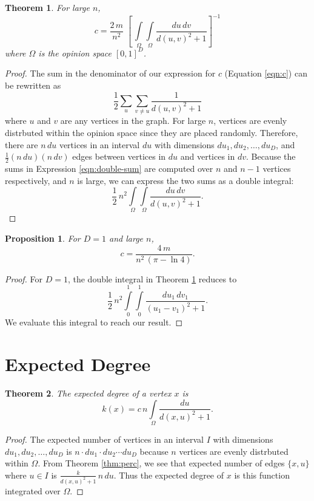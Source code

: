 \documentclass[a4paper,10pt]{article}
\newtheorem{prop}{Proposition}
\newtheorem{theorem}{Theorem}
\begin{document}
\begin{theorem}
\label{thm:c}
For large $n$,
 \begin{equation}
  c = \frac{2\, m}{n^2} \; \left[\,\int\limits_\Omega \int\limits_\Omega \frac{du\, dv}{d(u, v)^2 + 1}\right]^{-1}
 \end{equation}
where $\Omega$ is the opinion space $[0, 1]^D$.
\end{theorem}
\begin{proof}
 The sum in the denominator of our expression for $c$ (Equation \ref{eqn:c}) can be rewritten as
 \begin{equation}
 \label{eqn:double-sum}
  \frac{1}{2} \sum\limits_{u}\sum\limits_{v \neq u} \frac{1}{d(u, v)^2 + 1}
 \end{equation}
 where $u$ and $v$ are any vertices in the graph. For large $n$, vertices are evenly distrbuted within the opinion space since they are placed randomly. Therefore, there are $n \,du$ vertices in an interval $du$ with dimensions $du_1, du_2, \ldots, du_D$, and $\frac{1}{2}(n\, du)(n\, dv)$ edges between vertices in $du$ and vertices in $dv$. Because the sums in Expression \ref{eqn:double-sum} are computed over $n$ and $n - 1$ vertices respectively, and $n$ is large, we can express the two sums as a double integral:
 \begin{equation}
  \frac{1}{2}\, n^2 \int\limits_\Omega \int\limits_\Omega \frac{du \, dv}{d(u, v)^2 + 1}.
 \end{equation}
\end{proof}
\begin{prop}
 For $D=1$ and large $n$,
 \begin{equation*}
  c = \frac{4 \,m}{n^2 \,(\pi - \ln 4)}.
 \end{equation*}
\end{prop}
\begin{proof}
For $D=1$, the double integral in Theorem \ref{thm:c} reduces to
 \begin{equation}
  \frac{1}{2}\, n^2 \int\limits_0^1 \int\limits_0^1 \frac{du_1 \, dv_1}{(u_1 - v_1)^2 + 1}.
 \end{equation}
We evaluate this integral to reach our result.
\end{proof}

\section{Expected Degree}
\begin{theorem}
\label{thm:kx}
The expected degree of a vertex $x$ is
 \begin{equation}
 k(x) = c\,n\int\limits_\Omega \frac{du}{d(x, u)^2 + 1}.
\end{equation}
\end{theorem}
\begin{proof}
The expected number of vertices in an interval $I$ with dimensions $du_1, du_2, \ldots, du_D$  is $n \cdot du_1 \cdot du_2 \cdots du_D$ because $n$ vertices are evenly distrbuted within $\Omega$. From Theorem \ref{thm:perc}, we see that expected number of edges $\{x, u\}$ where $u \in I$ is $\frac{k}{d(x, u)^2 + 1} \, n \, du$. Thus the expected degree of $x$ is this function integrated over $\Omega$.
\end{proof}
\end{document}
